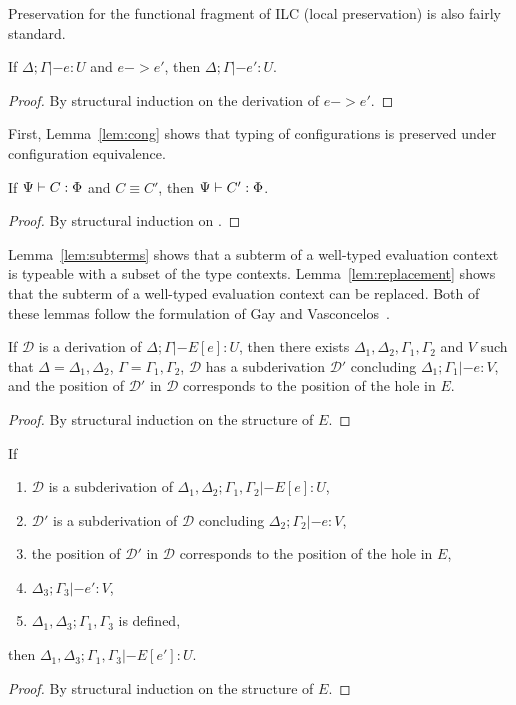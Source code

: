 Preservation for the functional fragment of ILC (local preservation) is also
fairly standard.

\begin{theorem}
  If $\Delta; \Gamma|- e : U$ and $e -> e'$, then $\Delta; \Gamma|- e' : U$.
  \begin{proof}
    By structural induction on the derivation of $e -> e'$.
  \end{proof}
\end{theorem}

First, Lemma~\ref{lem:cong} shows that typing of configurations is preserved
under configuration equivalence.

\begin{lemma}[\todo{}]\label{lem:cong}
  If $\Psi |- C : \Phi$ and $C \equiv C'$, then $\Psi |- C' : \Phi$.
  \begin{proof}
    By structural induction on \todo{}.
  \end{proof}
\end{lemma}

Lemma~\ref{lem:subterms} shows that a subterm of a well-typed evaluation context
is typeable with a subset of the type contexts. Lemma~\ref{lem:replacement}
shows that the subterm of a well-typed evaluation context can be replaced. Both
of these lemmas follow the formulation of Gay and
Vasconcelos~\cite{gay2010linear}.

\begin{lemma}\label{lem:subterms}
  If $\mathcal{D}$ is a derivation of $\Delta; \Gamma |- E[e] : U$, then there exists $\Delta_1, \Delta_2,
  \Gamma_1,\Gamma_2$ and $V$ such that $\Delta = \Delta_1,\Delta_2$, $\Gamma = \Gamma_1,\Gamma_2$, $\mathcal{D}$ has a
  subderivation $\mathcal{D}'$ concluding $\Delta_1;\Gamma_1 |- e : V$, and the position of $\mathcal{D}'$ in
  $\mathcal{D}$ corresponds to the position of the hole in $E$.
  \begin{proof}
    By structural induction on the structure of $E$.
  \end{proof}
\end{lemma}

\begin{lemma}\label{lem:replacement}
  If
  \begin{enumerate}
  \item $\mathcal{D}$ is a subderivation of $\Delta_1,\Delta_2;\Gamma_1,\Gamma_2 |- E[e] : U$,
  \item $\mathcal{D}'$ is a subderivation of $\mathcal{D}$ concluding $\Delta_2;
    \Gamma_2 |- e : V$,
  \item the position of $\mathcal{D}'$ in $\mathcal{D}$ corresponds to the
    position of the hole in $E$,
  \item $\Delta_3;\Gamma_3 |- e' : V$,
  \item $\Delta_1,\Delta_3;\Gamma_1,\Gamma_3$ is defined,
  \end{enumerate}
  then $\Delta_1,\Delta_3;\Gamma_1,\Gamma_3 |- E[e'] : U$.
  \begin{proof}
    By structural induction on the structure of $E$.
  \end{proof}  
\end{lemma}

